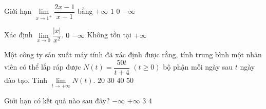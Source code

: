 \begin{ex}%
	Giới hạn  $\lim\limits_{x\to{1^{+}}}\dfrac{2x-1}{x-1}$ bằng
	\choice 
		{\True  $+\infty$}
		 {$1$}
		{$0$} 
		 {$-\infty$}
\end{ex}

\begin{ex}%
	Xác định $\lim\limits_{x\to 0}\dfrac{\left|x\right|}{x^2}$. 
	 \choice
		{$0$} 
		 {$-\infty$}
		{\True Không tồn  tại}
		{$+\infty$} 
\end{ex}

\begin{ex}%
	Một công ty sản xuất máy tính đã xác định được rằng, tính trung bình một nhân viên có thể lắp ráp được $N(t)=\dfrac{50t}{t+4}$ $(t\ge0)$ bộ phận mỗi ngày sau $t$ ngày đào tạo. Tính $\lim\limits_{t\to+\infty }N(t)$. 
	\choice 
		{$20$} 
		 {$30$}
		{$40$} 
		{\True $50$} 
\end{ex}

\begin{ex}%
	Giới hạn có kết quả nào  sau đây?
	\choice 
		 {\True $-\infty$}
		{$+\infty$} 
		{$3$} 
		{$4$} 
\end{ex}

